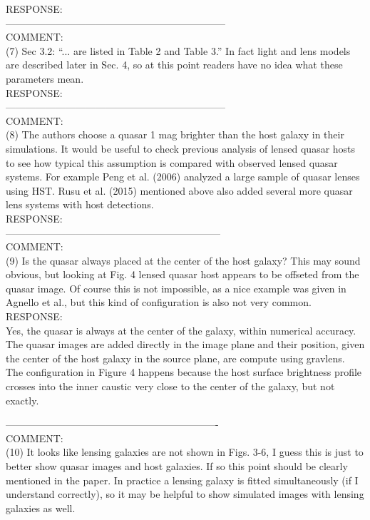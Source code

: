\documentclass[a4paper,11pt]{article}
\begin{document}
RESPONSE:
\\

------------------------------------------------------------------
\\
COMMENT:
\\
(7) Sec 3.2: “... are listed in Table 2 and Table 3.” In fact light and lens models are described later in Sec. 4, so at this point readers have no idea what these parameters mean.
\\

RESPONSE:
\\

------------------------------------------------------------------
\\
COMMENT:
\\
(8) The authors choose a quasar 1 mag brighter than the host galaxy in their simulations. It would be useful to check previous analysis of lensed quasar hosts to see how typical this assumption is compared with observed lensed quasar systems. For example Peng et al. (2006) analyzed a large sample of quasar lenses using HST. Rusu et al. (2015) mentioned above also added several more quasar lens systems with host detections.
\\

RESPONSE:
\\

-----------------------------------------------------------------
\\
COMMENT:
\\
(9) Is the quasar always placed at the center of the host galaxy? This may sound obvious, but looking at Fig. 4 lensed quasar host appears to be offseted from the quasar image. Of course this is not impossible, as a nice example was given in Agnello et al., but this kind of configuration is also not very common.
\\

RESPONSE:
\\
Yes, the quasar is always at the center of the galaxy, within numerical accuracy. The quasar images are added directly in the image plane and their position, given the center of the host galaxy in the source plane, are compute using gravlens. The configuration in Figure 4 happens because the host surface brightness profile crosses into the inner caustic very close to the center of the galaxy, but not exactly.

----------------------------------------------------------------
\\
COMMENT:
\\
(10) It looks like lensing galaxies are not shown in Figs. 3-6, I guess this is just to better show quasar images and host galaxies. If so this point should be clearly mentioned in the paper. In practice a lensing galaxy is fitted simultaneously (if I understand correctly), so it may be helpful to show simulated images with lensing galaxies as well.
\\
\end{document}
